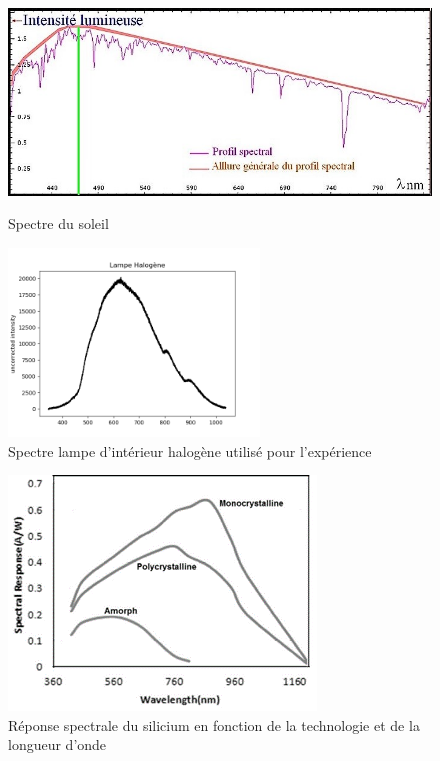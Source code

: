 \documentclass{rapportENS}
\begin{document}
  \begin{figure}[h!]
     \centering
      \begin{minipage}[c]{0.5\linewidth}
      \centering
     \includegraphics[width=0.9\linewidth]{spectre_soleil.jpg}
     \caption{Spectre du soleil}
     \label{fig:spectre_soleil}
     \end{minipage}\hfill
      \begin{minipage}[c]{0.5\linewidth}
      \centering
     \includegraphics[width=0.9\linewidth,height=5cm]{halogene.png}
     \caption{Spectre lampe d'intérieur halogène utilisé pour l'expérience}
     \label{fig:halogène}
     \end{minipage}\hfill
 \end{figure}
 
 \begin{figure}[h!]
     \centering
     \includegraphics [scale=1]{silicium.png}
     \caption{Réponse spectrale du silicium en fonction de la technologie et de la longueur d'onde}
     \label{fig:silicium}
 \end{figure}
\end{document}
